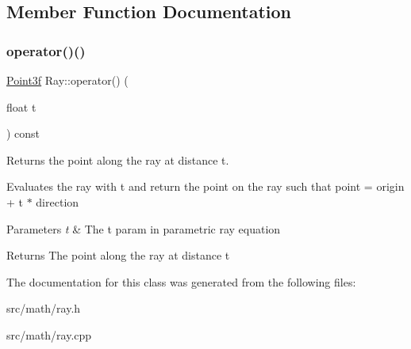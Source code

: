 \subsection{Member Function Documentation}
\mbox{\label{class_ray_a89105097d4add5018efa0795ee9cfb44}} 
\subsubsection{\texorpdfstring{operator()()}{operator()()}}
{\footnotesize\ttfamily \mbox{\hyperlink{class_point}{Point3f}} Ray\+::operator() (\begin{DoxyParamCaption}\item[{float}]{t }\end{DoxyParamCaption}) const\hspace{0.3cm}{\ttfamily [inline]}}



Returns the point along the ray at distance t. 

Evaluates the ray with t and return the point on the ray such that point = origin + t $\ast$ direction


\begin{DoxyParams}{Parameters}
{\em t} & The t param in parametric ray equation\\
\hline
\end{DoxyParams}
\begin{DoxyReturn}{Returns}
The point along the ray at distance t 
\end{DoxyReturn}


The documentation for this class was generated from the following files\+:\begin{DoxyCompactItemize}
\item 
src/math/ray.\+h\item 
src/math/ray.\+cpp\end{DoxyCompactItemize}
